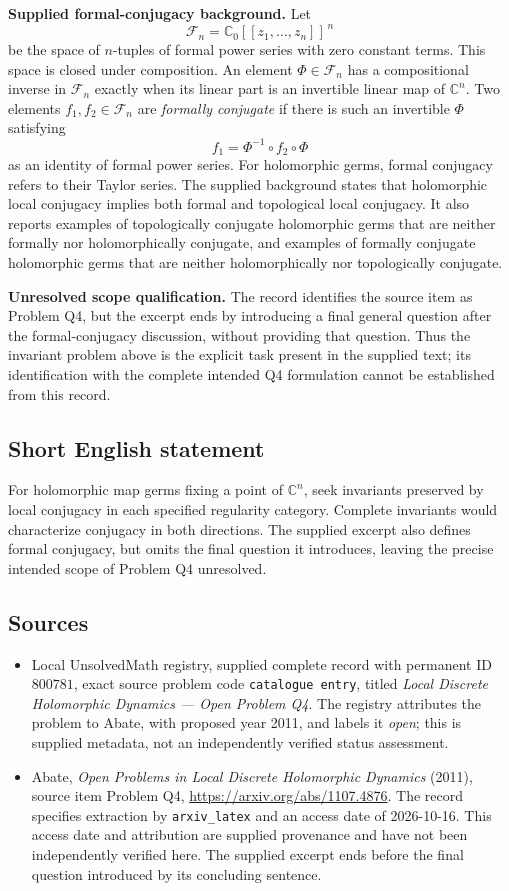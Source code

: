\documentclass[11pt]{article}
\newcommand{\C}{\mathbb{C}}
\begin{document}
\textbf{Supplied formal-conjugacy background.} Let
\[
\mathcal F_n=\C_0[[z_1,\ldots,z_n]]^{\,n}
\]
be the space of \(n\)-tuples of formal power series with zero constant terms. This space is closed under composition. An element \(\Phi\in\mathcal F_n\) has a compositional inverse in \(\mathcal F_n\) exactly when its linear part is an invertible linear map of \(\C^n\). Two elements \(f_1,f_2\in\mathcal F_n\) are \emph{formally conjugate} if there is such an invertible \(\Phi\) satisfying
\[
f_1=\Phi^{-1}\circ f_2\circ\Phi
\]
as an identity of formal power series. For holomorphic germs, formal conjugacy refers to their Taylor series. The supplied background states that holomorphic local conjugacy implies both formal and topological local conjugacy. It also reports examples of topologically conjugate holomorphic germs that are neither formally nor holomorphically conjugate, and examples of formally conjugate holomorphic germs that are neither holomorphically nor topologically conjugate.

\textbf{Unresolved scope qualification.} The record identifies the source item as Problem Q4, but the excerpt ends by introducing a final general question after the formal-conjugacy discussion, without providing that question. Thus the invariant problem above is the explicit task present in the supplied text; its identification with the complete intended Q4 formulation cannot be established from this record.
\subsection{Short English statement}
For holomorphic map germs fixing a point of \(\C^n\), seek invariants preserved by local conjugacy in each specified regularity category. Complete invariants would characterize conjugacy in both directions. The supplied excerpt also defines formal conjugacy, but omits the final question it introduces, leaving the precise intended scope of Problem Q4 unresolved.
\subsection{Sources}
\begin{itemize}
\item Local UnsolvedMath registry, supplied complete record with permanent ID \(800781\), exact source problem code \texttt{catalogue entry}, titled \emph{Local Discrete Holomorphic Dynamics --- Open Problem Q4}. The registry attributes the problem to Abate, with proposed year 2011, and labels it \emph{open}; this is supplied metadata, not an independently verified status assessment.
\item Abate, \emph{Open Problems in Local Discrete Holomorphic Dynamics} (2011), source item Problem Q4, \url{https://arxiv.org/abs/1107.4876}. The record specifies extraction by \texttt{arxiv\_latex} and an access date of 2026-10-16. This access date and attribution are supplied provenance and have not been independently verified here. The supplied excerpt ends before the final question introduced by its concluding sentence.
\end{itemize}
\end{document}
